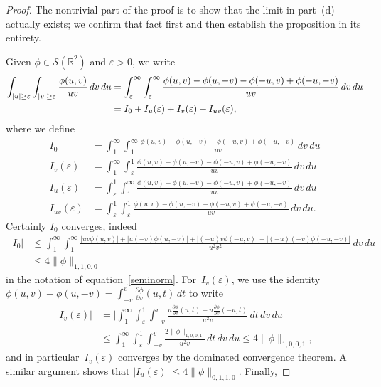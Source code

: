 \documentclass[11pt]{article}
\theoremstyle{plain}
\theoremstyle{definition}
\numberwithin{equation}{section}
\newcommand{\R}{\mathbb R}
\newcommand{\0}{{\vec 0}}
\begin{document}
\begin{proof}
The nontrivial part of the proof is to show that the limit in part~(d) actually exists; we confirm that fact first and then establish the proposition in its entirety.

Given $\phi\in\mathcal{S}(\R^2)$ and $\varepsilon>0$, we write
\begin{align}
\int_{|u|\ge \varepsilon}\int_{|v|\ge \varepsilon}\frac{\phi(u,v)}{u v}\,dv\,du &= \int_{\varepsilon}^\infty \int_{\varepsilon}^\infty \frac{\phi(u,v)-\phi(u,-v)-\phi(-u,v)+\phi(-u,-v)}{u v}\,dv\,du \notag \\
&= I_0 + I_u(\varepsilon) + I_v(\varepsilon) + I_{uv}(\varepsilon),
\label{Iuv}
\end{align}
where we define
\begin{align*}
I_0 &= \int_1^\infty \int_1^\infty \frac{\phi(u,v)-\phi(u,-v)-\phi(-u,v)+\phi(-u,-v)}{u v}\,dv\,du \\
I_v(\varepsilon) &= \int_1^\infty \int_\varepsilon^1\frac{\phi(u,v)-\phi(u,-v)-\phi(-u,v)+\phi(-u,-v)}{u v}\,dv\,du\\
I_u(\varepsilon) &= \int_\varepsilon^1 \int_1^\infty \frac{\phi(u,v)-\phi(u,-v)-\phi(-u,v)+\phi(-u,-v)}{u v}\,dv\,du\\
I_{uv}(\varepsilon) &= \int_\varepsilon^1\int_\varepsilon^1\frac{\phi(u,v)-\phi(u,-v)-\phi(-u,v)+\phi(-u,-v)}{u v}\,dv\,du.
\end{align*}
Certainly $I_0$ converges, indeed
\begin{align*}
|I_0| &\le \int_1^\infty \int_1^\infty \frac{|uv\phi(u,v)|+|u(-v)\phi(u,-v)|+|(-u)v\phi(-u,v)|+|(-u)(-v)\phi(-u,-v)|}{u^2 v^2}\,dv\,du \\
&\le 4\|\phi\|_{1,1,0,0}
\end{align*}
in the notation of equation~\eqref{seminorm}. For~$I_v(\varepsilon)$, we use the identity $\phi(u,v)-\phi(u,-v)=\int_{-v}^{v}\frac{\partial \phi}{\partial v}(u,t) \,dt$ to write
\begin{align*}
|I_v(\varepsilon)| &= \biggl| \int_1^\infty \int_\varepsilon^1 \int_{-v}^v \frac{u\frac{\partial \phi}{\partial v}(u,t) - u\frac{\partial \phi}{\partial v}(-u,t)}{u^2 v} \,dt\,dv\,du \biggr| \\
&\le \int_1^\infty \int_\varepsilon^1 \int_{-v}^v \frac{2\|\phi\|_{1,0,0,1}}{u^2v} \,dt\,dv\,du \le 4\|\phi\|_{1,0,0,1},
\end{align*}
and in particular~$I_v(\varepsilon)$ converges by the dominated convergence theorem. A similar argument shows that $|I_u(\varepsilon)| \le 4\|\phi\|_{0,1,1,0}$. Finally,

\end{proof}
\end{document}
